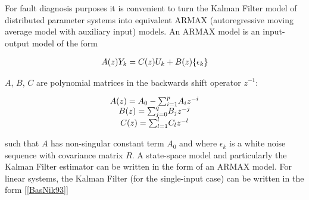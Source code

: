 \documentclass[journal]{IEEEtran}
\begin{document}
\noindent For fault diagnosis purposes it is convenient to turn the Kalman Filter model of distributed parameter systems into equivalent ARMAX (autoregressive moving average model with auxiliary input) models. An ARMAX model is an input-output model of the form

\begin{equation} \label{ARMAX_model}
\begin{tabular}{c}
$A(z){Y_k}=C(z)U_k+B(z)\{\epsilon_k\}$
\end{tabular}
\end{equation}

\noindent $A$, $B$, $C$ are polynomial matrices in the backwards shift operator $z^{-1}$:

\begin{equation} \label{ARMA_model_components}
\begin{tabular}{c}
$A(z)=A_0-{\sum_{i=1}^p}{A_i}{z^{-i}}$ \\
$B(z)={\sum_{j=0}^q}{B_j}{z^{-j}}$ \\
$C(z)={\sum_{l=1}^l}{C_l}z^{-l}$
\end{tabular}
\end{equation}

\noindent such that $A$ has non-singular constant term $A_0$ and where ${\epsilon_k}$ is a white noise sequence with covariance matrix $R$. A state-space model and particularly the Kalman Filter estimator can be written in the form of an ARMAX model. For linear systems, the Kalman Filter (for the single-input case) can be written in the form [\ref{BasNik93}]
\end{document}
